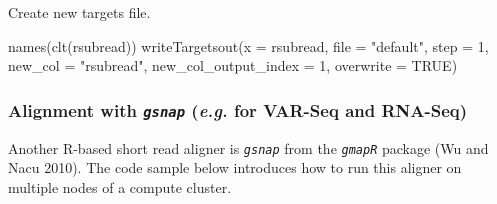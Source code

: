\documentclass[14pt,]{article}
\newcommand{\hlnum}[1]{\textcolor[rgb]{0.816,0.125,0.439}{#1}}%
\newcommand{\hlstr}[1]{\textcolor[rgb]{0.251,0.627,0.251}{#1}}%
\newcommand{\hlstd}[1]{\textcolor[rgb]{0.251,0.251,0.251}{#1}}%
\newenvironment{Shaded}{\begin{myshaded}}{\end{myshaded}}
\newcommand{\DecValTok}[1]{\hlnum{#1}}
\newcommand{\ConstantTok}[1]{\hlnum{#1}}
\newcommand{\StringTok}[1]{\hlstr{#1}}
\newcommand{\FunctionTok}[1]{\hlstd{#1}}
\newcommand{\AttributeTok}[1]{{#1}}
\newcommand{\NormalTok}[1]{\hlstd{#1}}
\begin{document}
Create new targets file.

\begin{Shaded}
\begin{Highlighting}[]
\FunctionTok{names}\NormalTok{(}\FunctionTok{clt}\NormalTok{(rsubread))}
\FunctionTok{writeTargetsout}\NormalTok{(}\AttributeTok{x =}\NormalTok{ rsubread, }\AttributeTok{file =} \StringTok{"default"}\NormalTok{, }\AttributeTok{step =} \DecValTok{1}\NormalTok{, }\AttributeTok{new\_col =} \StringTok{"rsubread"}\NormalTok{, }\AttributeTok{new\_col\_output\_index =} \DecValTok{1}\NormalTok{, }
    \AttributeTok{overwrite =} \ConstantTok{TRUE}\NormalTok{)}
\end{Highlighting}
\end{Shaded}

\hypertarget{alignment-with-gsnap-e.g.-for-var-seq-and-rna-seq}{%
\subsubsection{\texorpdfstring{Alignment with \emph{\texttt{gsnap}} (\emph{e.g.} for VAR-Seq and RNA-Seq)}{Alignment with gsnap (e.g. for VAR-Seq and RNA-Seq)}}\label{alignment-with-gsnap-e.g.-for-var-seq-and-rna-seq}}

Another R-based short read aligner is \emph{\texttt{gsnap}} from the \emph{\texttt{gmapR}} package (Wu and Nacu 2010).
The code sample below introduces how to run this aligner on multiple nodes of a compute cluster.
\end{document}
